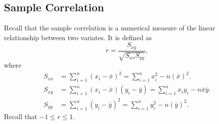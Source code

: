 \documentclass[oneside]{book}\usepackage[]{graphicx}\usepackage[svgnames]{xcolor}
\begin{document}
\subsection{Sample Correlation}
Recall that the sample correlation is a numerical measure of the linear relationship between two variates.
It is defined as
\[ r =\frac{S_{x y}}{\sqrt{S_{x x} S_{y y}}}, \]
where
\begin{align*}
    S_{x x} & =\sum_{i=1}^{n}(x_{i}-\bar{x})^{2}=\sum_{i=1}^{n} x_{i}^{2}-n(\bar{x})^{2}.                 \\
    S_{x y} & =\sum_{i=1}^{n}(x_{i}-\bar{x})(y_{i}-\bar{y})=\sum_{i=1}^{n} x_{i} y_{i}-n \bar{x} \bar{y}. \\
    S_{y y} & =\sum_{i=1}^{n}(y_{i}-\bar{y})^{2}=\sum_{i=1}^{n} y_{i}^{2}-n(\bar{y})^{2}.
\end{align*}
Recall that $ -1\le r\le 1 $.
\end{document}

